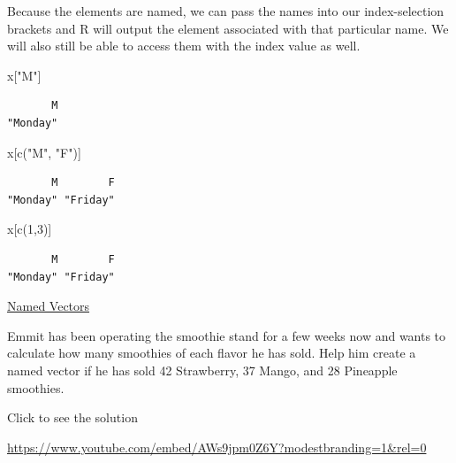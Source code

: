 \documentclass[
  letterpaper,
  DIV=11,
  numbers=noendperiod]{scrreprt}
\newenvironment{Shaded}{\begin{snugshade}}{\end{snugshade}}
\newcommand{\DecValTok}[1]{\textcolor[rgb]{0.68,0.00,0.00}{#1}}
\newcommand{\FunctionTok}[1]{\textcolor[rgb]{0.28,0.35,0.67}{#1}}
\newcommand{\NormalTok}[1]{\textcolor[rgb]{0.00,0.23,0.31}{#1}}
\newcommand{\StringTok}[1]{\textcolor[rgb]{0.13,0.47,0.30}{#1}}
\begin{document}
Because the elements are named, we can pass the names into our
index-selection brackets and R will output the element associated with
that particular name. We will also still be able to access them with the
index value as well.

\begin{Shaded}
\begin{Highlighting}[]
\NormalTok{x[}\StringTok{"M"}\NormalTok{]}
\end{Highlighting}
\end{Shaded}

\begin{verbatim}
       M 
"Monday" 
\end{verbatim}

\begin{Shaded}
\begin{Highlighting}[]
\NormalTok{x[}\FunctionTok{c}\NormalTok{(}\StringTok{"M"}\NormalTok{, }\StringTok{"F"}\NormalTok{)]}
\end{Highlighting}
\end{Shaded}

\begin{verbatim}
       M        F 
"Monday" "Friday" 
\end{verbatim}

\begin{Shaded}
\begin{Highlighting}[]
\NormalTok{x[}\FunctionTok{c}\NormalTok{(}\DecValTok{1}\NormalTok{,}\DecValTok{3}\NormalTok{)]}
\end{Highlighting}
\end{Shaded}

\begin{verbatim}
       M        F 
"Monday" "Friday" 
\end{verbatim}

\begin{watch}{}{}
    \href{https://youtu.be/uYHuPb60zSA}{Named Vectors}
\end{watch}

\begin{tcolorbox}[enhanced jigsaw, colbacktitle=quarto-callout-tip-color!10!white, breakable, bottomrule=.15mm, colframe=quarto-callout-tip-color-frame, left=2mm, opacitybacktitle=0.6, title=\textcolor{quarto-callout-tip-color}{\faLightbulb}\hspace{0.5em}{Try it Out}, leftrule=.75mm, opacityback=0, rightrule=.15mm, titlerule=0mm, bottomtitle=1mm, colback=white, toprule=.15mm, arc=.35mm, toptitle=1mm, coltitle=black]

Emmit has been operating the smoothie stand for a few weeks now and
wants to calculate how many smoothies of each flavor he has sold. Help
him create a named vector if he has sold 42 Strawberry, 37 Mango, and 28
Pineapple smoothies.

Click to see the solution

\url{https://www.youtube.com/embed/AWs9jpm0Z6Y?modestbranding=1&rel=0}

\end{tcolorbox}
\end{document}
